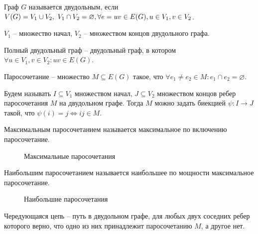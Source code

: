 
	\begin{Def}
		Граф $G$ называется двудольным, если $V(G) = V_1 \cup V_2, \ V_1 \cap V_2 = \varnothing,\\
		\forall e = uv \in E(G), u \in V_1, v \in V_2$.
		
		$V_1$ -- множество начал, $V_2$ -- множеством концов двудольного графа.
	\end{Def}

	\begin{Def}
		Полный двудольный граф -- двудольный граф, в котором $\forall u \in V_1, v \in V_2: uv \in E(G)$.
	\end{Def}

	\begin{Def}
		Паросочетание -- множество $M \subseteq E(G)$ такое, что $\forall e_1 \neq e_2 \in M: e_1 \cap e_2 = \varnothing$.

		Будем называть $I \subseteq V_1$ множеством начал, $J \subseteq V_2$ множеством концов ребер паросочетания $M$ на двудольном графе. Тогда $M$ можно задать
		биекцией $\psi : I \to J$ такой, что $\psi(i) = j \Leftrightarrow ij \in M$.
	\end{Def}

	\begin{Def}
		Максимальным паросочетанием называется максимальное по включению паросочетание.
	\end{Def}

	\begin{figure*}[h]
		\centering
		\def\svgwidth{0.3\columnwidth}
		
		\caption{Максимальные паросочетания}
	\end{figure*}
		
	\begin{Def}
		Наибольшим паросочетанием называется наибольшее по мощности максимальное паросочетание.
	\end{Def}

	\begin{figure*}[h]
		\centering
		\def\svgwidth{0.3\columnwidth}
		
		\caption{Наибольшие паросочетания}
	\end{figure*}

	\begin{Def}
		Чередующаяся цепь -- путь в двудольном графе, для любых двух соседних ребер которого верно, что одно из них принадлежит паросочетанию $M$, а другое нет.
	\end{Def}

